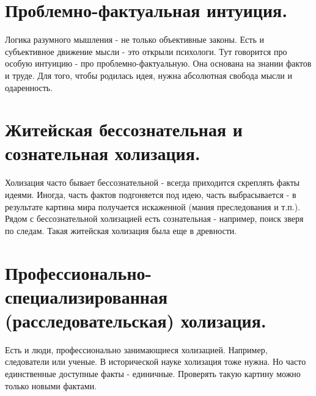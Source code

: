 \section{ Проблемно-фактуальная интуиция.}
Логика разумного мышления - не только объективные законы. Есть и субъективное движение мысли - это открыли психологи. Тут говорится про особую интуицию - про проблемно-фактуальную. Она основана на знании фактов и труде. Для того, чтобы родилась идея, нужна абсолютная свобода мысли и одаренность.

\section{ Житейская бессознательная и сознательная холизация. }
Холизация часто бывает бессознательной - всегда приходится скреплять факты идеями. Иногда, часть фактов подгоняется под идею, часть выбрасывается - в результате картина мира получается искаженной (мания преследования и т.п.). Рядом с бессознательной холизацией есть сознательная - например, поиск зверя по следам. Такая житейская холизация была еще в древности.

\section{ Профессионально-специализированная (расследовательская) холизация.}
Есть и люди, профессионально занимающиеся холизацией. Например, следователи или ученые.
В исторической науке холизация тоже нужна. Но часто единственные доступные факты - единичные. Проверять такую картину можно только новыми фактами.


